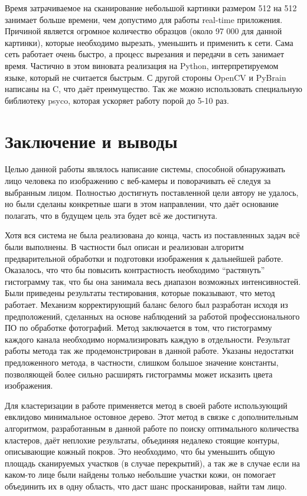\documentclass[12pt]{report}
\begin{document}
Время затрачиваемое на сканирование небольшой картинки размером 512 на 512 занимает больше времени, чем допустимо 
для  
работы real-time приложения. Причиной является огромное количество образцов (около 97 000 для данной картинки), 
которые необходимо вырезать, уменьшить и применить к сети. Сама сеть работает очень быстро, а процесс вырезания и 
передачи в сеть занимает время. Частично в этом виновата реализация на Python, интерпретируемом языке, который не 
считается быстрым. С другой стороны OpenCV и PyBrain написаны на C, что даёт преимущество. Так же можно 
использовать 
специальную библиотеку psyco, которая ускоряет работу порой до 5-10 раз.

\chapter*{Заключение и выводы}
\thispagestyle{fancy}

Целью данной работы являлось написание системы, способной обнаруживать лицо человека по изображению с веб-камеры и  
поворачивать её следуя за выбранным лицом. Полностью достигнуть поставленной цели автору не удалось, но были 
сделаны конкретные шаги в этом направлении, что даёт основание полагать, что в будущем цель эта будет всё же 
достигнута.

Хотя вся система не была реализована до конца, часть из поставленных задач всё были выполнены. В частности был 
описан и реализован алгоритм предварительной обработки и подготовки изображения к дальнейшей работе. Оказалось, что 
что бы повысить контрастность необходимо ``растянуть'' гистограмму так, что бы она занимала весь диапазон возможных 
интенсивностей. Были приведены результаты тестирования, которые показывают, что метод работает. Механизм 
корректирующий баланс белого был разработан исходя из предположений, сделанных на основе наблюдений за работой 
профессионального ПО по обработке фотографий. Метод заключается в том, что гистограмму каждого канала необходимо 
нормализировать каждую в отдельности. Результат работы метода так же продемонстрирован в данной работе. Указаны 
недостатки предложенного метода, в частности, слишком большое значение константы, позволяющей более сильно 
расширять гистограммы может исказить цвета изображения. 

Для кластеризации в работе применяется метод в своей работе использующий евклидово минимальное остовное дерево. 
Этот метод в связке с дополнительным алгоритмом, разработанным в данной работе по поиску оптимального количества 
кластеров, даёт неплохие результаты, объединяя недалеко стоящие контуры, описывающие кожный покров. Это необходимо, 
что бы уменьшить общую площадь сканируемых участков (в случае перекрытий), а так же в случае если на каком-то лице 
были найдены только небольшие участки кожи, он помогает объединить их в одну область, что даст шанс просканировав, 
найти там лицо.
\end{document}
